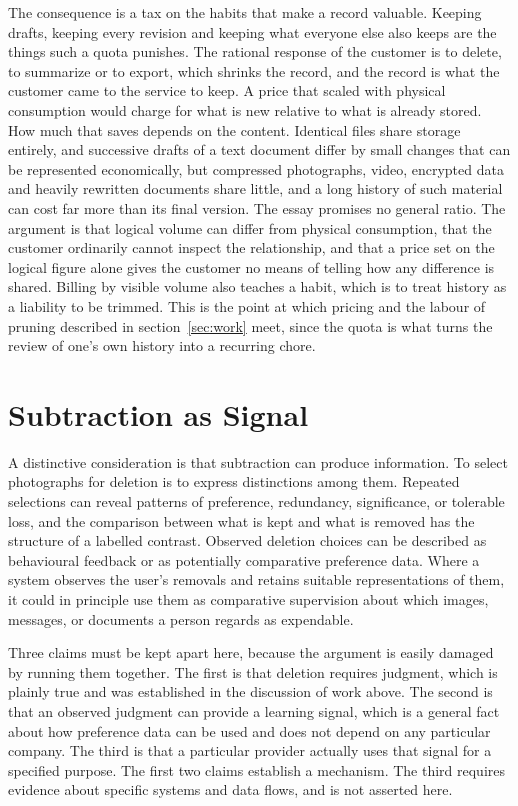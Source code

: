 \documentclass[12pt]{article}
\begin{document}
The consequence is a tax on the habits that make a record valuable. Keeping drafts, keeping every revision and keeping what everyone else also keeps are the things such a quota punishes. The rational response of the customer is to delete, to summarize or to export, which shrinks the record, and the record is what the customer came to the service to keep. A price that scaled with physical consumption would charge for what is new relative to what is already stored. How much that saves depends on the content. Identical files share storage entirely, and successive drafts of a text document differ by small changes that can be represented economically, but compressed photographs, video, encrypted data and heavily rewritten documents share little, and a long history of such material can cost far more than its final version. The essay promises no general ratio. The argument is that logical volume can differ from physical consumption, that the customer ordinarily cannot inspect the relationship, and that a price set on the logical figure alone gives the customer no means of telling how any difference is shared. Billing by visible volume also teaches a habit, which is to treat history as a liability to be trimmed. This is the point at which pricing and the labour of pruning described in section~\ref{sec:work} meet, since the quota is what turns the review of one's own history into a recurring chore.

\section{Subtraction as Signal}

A distinctive consideration is that subtraction can produce information. To select photographs for deletion is to express distinctions among them. Repeated selections can reveal patterns of preference, redundancy, significance, or tolerable loss, and the comparison between what is kept and what is removed has the structure of a labelled contrast. Observed deletion choices can be described as behavioural feedback or as potentially comparative preference data. Where a system observes the user's removals and retains suitable representations of them, it could in principle use them as comparative supervision about which images, messages, or documents a person regards as expendable.

Three claims must be kept apart here, because the argument is easily damaged by running them together. The first is that deletion requires judgment, which is plainly true and was established in the discussion of work above. The second is that an observed judgment can provide a learning signal, which is a general fact about how preference data can be used and does not depend on any particular company. The third is that a particular provider actually uses that signal for a specified purpose. The first two claims establish a mechanism. The third requires evidence about specific systems and data flows, and is not asserted here.
\end{document}

